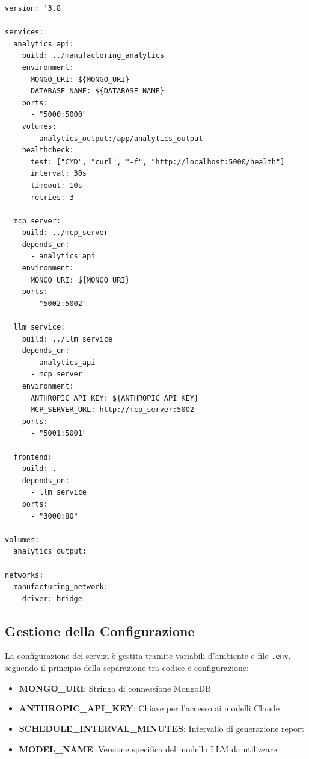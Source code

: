 \begin{listing}[H]
\begin{verbatim}
version: '3.8'

services:
  analytics_api:
    build: ../manufactoring_analytics
    environment:
      MONGO_URI: ${MONGO_URI}
      DATABASE_NAME: ${DATABASE_NAME}
    ports:
      - "5000:5000"
    volumes:
      - analytics_output:/app/analytics_output
    healthcheck:
      test: ["CMD", "curl", "-f", "http://localhost:5000/health"]
      interval: 30s
      timeout: 10s
      retries: 3

  mcp_server:
    build: ../mcp_server
    depends_on:
      - analytics_api
    environment:
      MONGO_URI: ${MONGO_URI}
    ports:
      - "5002:5002"

  llm_service:
    build: ../llm_service
    depends_on:
      - analytics_api
      - mcp_server
    environment:
      ANTHROPIC_API_KEY: ${ANTHROPIC_API_KEY}
      MCP_SERVER_URL: http://mcp_server:5002
    ports:
      - "5001:5001"

  frontend:
    build: .
    depends_on:
      - llm_service
    ports:
      - "3000:80"

volumes:
  analytics_output:

networks:
  manufacturing_network:
    driver: bridge
\end{verbatim}
\caption{Docker Compose per l'orchestrazione dei servizi}
\label{listing:docker-compose}
\end{listing}

\subsection{Gestione della Configurazione}
La configurazione dei servizi è gestita tramite variabili d'ambiente e file \texttt{.env}, seguendo il principio della separazione tra codice e configurazione:

\begin{itemize}
    \item \textbf{MONGO\_URI}: Stringa di connessione MongoDB
    \item \textbf{ANTHROPIC\_API\_KEY}: Chiave per l'accesso ai modelli Claude
    \item \textbf{SCHEDULE\_INTERVAL\_MINUTES}: Intervallo di generazione report
    \item \textbf{MODEL\_NAME}: Versione specifica del modello LLM da utilizzare
\end{itemize}

